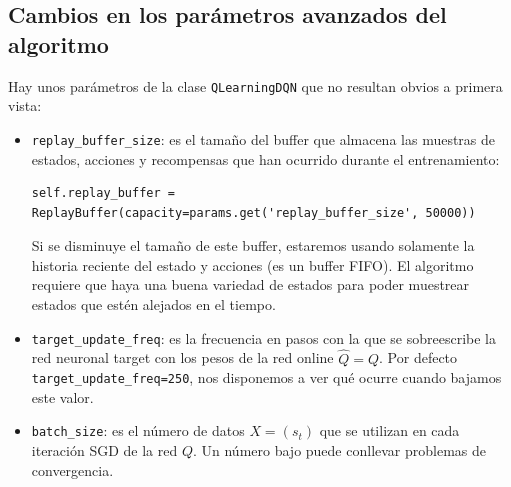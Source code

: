 \documentclass{article}
\begin{document}
\subsection{Cambios en los parámetros avanzados del algoritmo}
Hay unos parámetros de la clase \texttt{QLearningDQN} que no resultan obvios a primera vista:
\begin{itemize}
    \item \texttt{replay\_buffer\_size}: es el tamaño del buffer que almacena las muestras de estados, acciones y recompensas que han ocurrido durante el entrenamiento:
\begin{verbatim}
self.replay_buffer = ReplayBuffer(capacity=params.get('replay_buffer_size', 50000))
\end{verbatim}
    Si se disminuye el tamaño de este buffer, estaremos usando solamente la historia reciente del estado y acciones (es un buffer FIFO). El algoritmo requiere que haya una buena variedad de estados para poder muestrear estados que estén alejados en el tiempo.
    
    \item \texttt{target\_update\_freq}: es la frecuencia en pasos con la que se sobreescribe la red neuronal target con los pesos de la red online $\hat{Q}=Q$. Por defecto \texttt{target\_update\_freq=250}, nos disponemos a ver qué ocurre cuando bajamos este valor.
    \item \texttt{batch\_size}: es el número de datos $X=(s_t)$ que se utilizan en cada iteración SGD de la red $Q$. Un número bajo puede conllevar problemas de convergencia.
\end{itemize}
\end{document}
